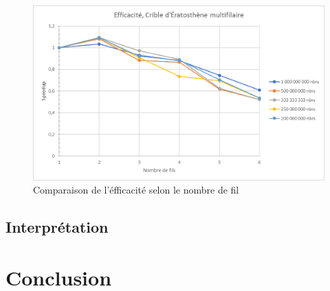 \documentclass{report}
\begin{document}
\begin{center}
	\begin{figure}[H]
		\includegraphics[scale=0.7]{Images/Graph_eff.png}
		\caption{Comparaison de l'éfficacité selon le nombre de fil}
	\end{figure}
\end{center}
\section{Interprétation}

\chapter{Conclusion}
\end{document}
